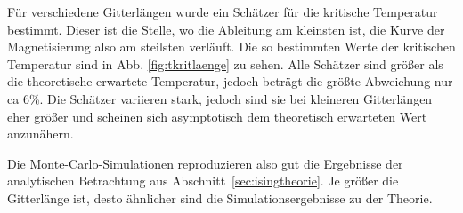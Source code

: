 	Für verschiedene Gitterlängen wurde ein Schätzer für die kritische Temperatur bestimmt. Dieser ist die Stelle, wo die Ableitung am kleinsten ist, die Kurve der Magnetisierung also am steilsten verläuft. Die so bestimmten Werte der kritischen Temperatur sind in Abb. \ref{fig:tkritlaenge} zu sehen. Alle Schätzer sind größer als die theoretische erwartete Temperatur, jedoch beträgt die größte Abweichung nur ca 6\%. Die Schätzer variieren stark, jedoch sind sie bei kleineren Gitterlängen eher größer und scheinen sich asymptotisch dem theoretisch erwarteten Wert anzunähern.
	
	Die Monte-Carlo-Simulationen reproduzieren also gut die Ergebnisse der analytischen Betrachtung aus Abschnitt~\ref{sec:isingtheorie}. Je größer die Gitterlänge ist, desto ähnlicher sind die Simulationsergebnisse zu der Theorie.
	
	
%	
%			
%			
%			
	
